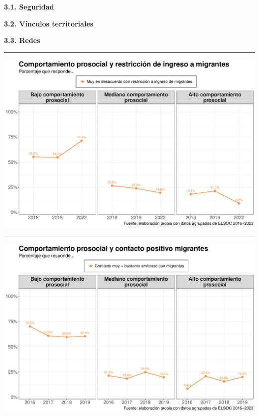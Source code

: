 \documentclass[
  spanish,
  letterpaper,
  DIV=11,
  numbers=noendperiod,
  oneside]{scrartcl}
\begin{document}
{\textbf{3.1. Seguridad}}

{\textbf{3.2. Vínculos territoriales}}

{\textbf{3.3. Redes}}

\begin{center}\rule{0.5\linewidth}{0.5pt}\end{center}

\begin{center}
\includegraphics[width=1\linewidth,height=\textheight,keepaspectratio]{cep_2025_files/figure-pdf/unnamed-chunk-10-1.pdf}
\end{center}

\begin{center}\rule{0.5\linewidth}{0.5pt}\end{center}

\begin{center}
\includegraphics[width=1\linewidth,height=\textheight,keepaspectratio]{cep_2025_files/figure-pdf/unnamed-chunk-11-1.pdf}
\end{center}
\end{document}
